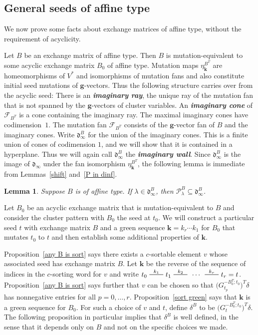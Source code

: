 \documentclass{amsart}
\newtheorem{lemma}[proposition]{Lemma}
\theoremstyle{definition}
\theoremstyle{remark}
\numberwithin{equation}{section}
\newcommand{\newword}[1]{\textbf{\emph{#1}}}
\newcommand{\edge}{\,\,\rule[2.7pt]{20pt}{0.5pt}\,\,}
\newcommand{\F}{{\mathcal F}}
\newcommand{\0}{{\mathbf{0}}}
\newcommand{\g}{\mathbf{g}}
\newcommand{\kk}{{\boldsymbol{k}}}
\renewcommand{\P}{\mathcal{P}}
\renewcommand{\d}{{\mathfrak d}}
\begin{document}
\subsection{General seeds of affine type}
We now prove some facts about exchange matrices of affine type, without the requirement of acyclicity.

Let $B$ be an exchange matrix of affine type.
Then $B$ is mutation-equivalent to some acyclic exchange matrix $B_0$ of affine type.
Mutation maps $\eta_\kk^{B^T}$ are homeomorphisms of $V^*$ and isomorphisms of mutation fans and also constitute initial seed mutations of $\g$-vectors.
Thus the following structure carries over from the acyclic seed:
There is an \newword{imaginary ray}, the unique ray of the mutation fan that is not spanned by the $\g$-vectors of cluster variables.
An \newword{imaginary cone} of $\F_{B^T}$ is a cone containing the imaginary ray.
The maximal imaginary cones have codimension~$1$.
The mutation fan $\F_{B^T}$ consists of the $\g$-vector fan of $B$ and the imaginary cones.
Write $\d^B_\infty$ for the union of the imaginary cones.
This is a finite union of cones of codimension $1$, and we will show that it is contained in a hyperplane.
Thus we will again call $\d^B_\infty$ the \newword{imaginary wall}.
Since $\d^B_\infty$ is the image of $\d_\infty$ under the fan isomorphism $\eta_\kk^{B^T}$, the following lemma is immediate from Lemmas~\ref{shift} and~\ref{P in dinf}.

\begin{lemma}\label{P in dBinf}
Suppose $B$ is of affine type.
If $\lambda\in\d^B_\infty$, then $\P^B_\lambda\subseteq\d^B_\infty$.
\end{lemma}

Let $B_0$ be an acyclic exchange matrix that is mutation-equivalent to $B$ and consider the cluster pattern with $B_0$ the seed at $t_0$.
We will construct a particular seed $t$ with exchange matrix $B$ and a green sequence $\kk=k_r\cdots k_1$ for $B_0$ that mutates $t_0$ to $t$ and then establish some additional properties of $\kk$.

Proposition~\ref{any B is sort} says there exists a $c$-sortable element $v$ whose associated seed has exchange matrix $B$.
Let $\kk$ be the reverse of the sequence of indices in the $c$-sorting word for $v$ and write $t_0\overset{k_1}{\edge}t_1\overset{k_2}{\edge}\,\cdots\,\overset{k_r}{\edge}t_r=t$.
Proposition~\ref{any B is sort} says further that $v$ can be chosen so that $\bigl(G_{t_p}^{-B_0^T;t_0}\bigr)^T\delta$ has nonnegative entries for all $p=0,\ldots,r$.
Proposition~\ref{sort green} says that $\kk$ is a green sequence for $B_0$.
For such a choice of $v$ and $t$, define $\delta^B$ to be $\bigl(G_t^{-B_0^T;t_0}\bigr)^T\delta$.  The following proposition in particular implies that $\delta^B$ is well defined, in the sense that it depends only on $B$ and not on the specific choices we made.
\end{document}
